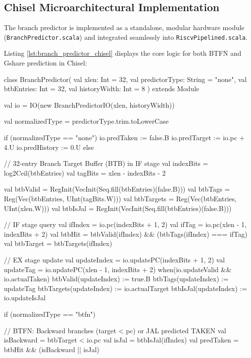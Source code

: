 \subsection{Chisel Microarchitectural Implementation}

The branch predictor is implemented as a standalone, modular hardware module (\texttt{BranchPredictor.scala}) and integrated seamlessly into \texttt{RiscvPipelined.scala}.

Listing \ref{lst:branch_predictor_chisel} displays the core logic for both BTFN and Gshare prediction in Chisel:

\begin{chiselcode}[caption={Chisel implementation of the parameterized Branch Predictor supporting Static BTFN and Dynamic Gshare (scabook/riscv/BranchPredictor.scala).}, label={lst:branch_predictor_chisel}]
class BranchPredictor(
  val xlen: Int = 32,
  val predictorType: String = "none",
  val btbEntries: Int = 32,
  val historyWidth: Int = 8
) extends Module {
  val io = IO(new BranchPredictorIO(xlen, historyWidth))

  val normalizedType = predictorType.trim.toLowerCase

  if (normalizedType == "none") {
    io.predTaken   := false.B
    io.predTarget  := io.pc + 4.U
    io.predHistory := 0.U
  } else {
    // 32-entry Branch Target Buffer (BTB) in IF stage
    val indexBits = log2Ceil(btbEntries)
    val tagBits   = xlen - indexBits - 2

    val btbValid   = RegInit(VecInit(Seq.fill(btbEntries)(false.B)))
    val btbTags    = Reg(Vec(btbEntries, UInt(tagBits.W)))
    val btbTargets = Reg(Vec(btbEntries, UInt(xlen.W)))
    val btbIsJal   = RegInit(VecInit(Seq.fill(btbEntries)(false.B)))

    // IF stage query
    val ifIndex = io.pc(indexBits + 1, 2)
    val ifTag   = io.pc(xlen - 1, indexBits + 2)
    val btbHit  = btbValid(ifIndex) && (btbTags(ifIndex) === ifTag)
    val btbTarget = btbTargets(ifIndex)

    // EX stage update
    val updateIndex = io.updatePC(indexBits + 1, 2)
    val updateTag   = io.updatePC(xlen - 1, indexBits + 2)
    when(io.updateValid && io.actualTaken) {
      btbValid(updateIndex)   := true.B
      btbTags(updateIndex)    := updateTag
      btbTargets(updateIndex) := io.actualTarget
      btbIsJal(updateIndex)   := io.updateIsJal
    }

    if (normalizedType == "btfn") {
      // BTFN: Backward branches (target < pc) or JAL predicted TAKEN
      val isBackward = btbTarget < io.pc
      val isJal      = btbIsJal(ifIndex)
      val predTaken  = btbHit && (isBackward || isJal)

}}}
\end{chiselcode}
